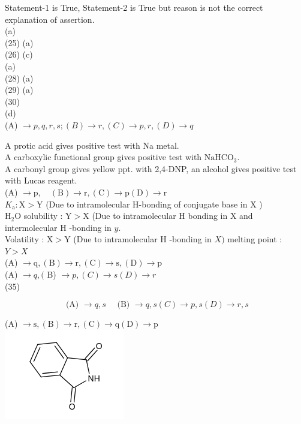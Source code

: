 \documentclass[10pt]{article}
\begin{document}
Statement-1 is True, Statement-2 is True but reason is not the correct explanation of assertion.\\
(a)\\
(25) (a)\\
(26) (c)\\
(a)\\
(28) (a)\\
(29) (a)\\
(30)\\
(d)\\
(A) $\rightarrow p, q, r, s ;(B) \rightarrow r,(C) \rightarrow p, r,(D) \rightarrow q$

A protic acid gives positive test with Na metal.\\
A carboxylic functional group gives positive test with $\mathrm{NaHCO}_{3}$.\\
A carbonyl group gives yellow ppt. with 2,4-DNP, an alcohol gives positive test with Lucas reagent.\\
(A) $\rightarrow \mathrm{p}, \quad(\mathrm{B}) \rightarrow \mathrm{r},(\mathrm{C}) \rightarrow \mathrm{p}(\mathrm{D}) \rightarrow \mathrm{r}$\\
$K_{\mathrm{a}}: \mathrm{X}>\mathrm{Y}$ (Due to intramolecular H-bonding of conjugate base in X )\\
$\mathrm{H}_{2} \mathrm{O}$ solubility : $\mathrm{Y}>\mathrm{X}$ (Due to intramolecular H bonding in X and intermolecular H -bonding in $y$.\\
Volatility : $\mathrm{X}>\mathrm{Y}$ (Due to intramolecular H -bonding in $X)$ melting point : $Y>X$\\
(A) $\rightarrow \mathrm{q},(\mathrm{B}) \rightarrow \mathrm{r},(\mathrm{C}) \rightarrow \mathrm{s},(\mathrm{D}) \rightarrow \mathrm{p}$\\
(A) $\rightarrow q,($ B) $\rightarrow p,(C) \rightarrow s(D) \rightarrow r$\\
(35)

$$
\text { (A) } \rightarrow q, s \quad \text { (B) } \rightarrow q, s(C) \rightarrow p, s(D) \rightarrow r, s
$$

(A) $\rightarrow \mathrm{s},(\mathrm{B}) \rightarrow \mathrm{r},(\mathrm{C}) \rightarrow \mathrm{q}(\mathrm{D}) \rightarrow \mathrm{p}$\\
\includegraphics{smile-c74384b2e7182d311cf23a46705ac93cefad22dd}
\end{document}
